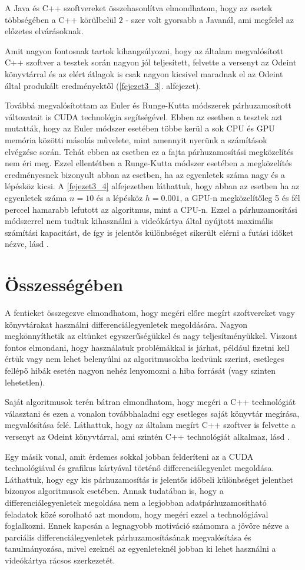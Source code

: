 A Java és C++ szoftvereket összehasonlítva elmondhatom, hogy az esetek többségében a C++ körülbelül $ 2 $ - szer volt gyorsabb a Javanál, ami megfelel az előzetes elvárásoknak.

Amit nagyon fontosnak tartok kihangsúlyozni, hogy az általam megvalósított C++ szoftver a tesztek során nagyon jól teljesített, felvette a versenyt az Odeint könyvtárral és az elért átlagok is csak nagyon kicsivel maradnak el az Odeint által produkált eredményektől (\ref{fejezet3_3}. alfejezet).

Továbbá megvalósítottam az Euler és Runge-Kutta módszerek párhuzamosított változatait is CUDA technológia segítségével. Ebben az esetben a tesztek azt mutatták, hogy az Euler módszer esetében többe kerül a sok CPU és GPU memória közötti másolás művelete, mint amennyit nyerünk a számítások elvégzése során. Tehát ebben az esetben ez a fajta párhuzamosítási megközelítés nem éri meg. Ezzel ellentétben a Runge-Kutta módszer esetében a megközelítés eredményesnek bizonyult abban az esetben, ha az egyenletek száma nagy és a lépésköz kicsi. A \ref{fejezet3_4} alfejezetben láthattuk, hogy abban az esetben ha az egyenletek száma $ n = 10 $ és a lépésköz $ h = 0.001 $, a GPU-n megközelítőleg 5 és fél perccel hamarabb lefutott az algoritmus, mint a CPU-n. Ezzel a párhuzamosítási módszerrel nem tudtuk kihasználni a videókártya által nyújtott maximális számítási kapacitást, de így is jelentős különbséget sikerült elérni a futási időket nézve, l\'asd \cite{Katai}.



\section {Összességében}

A fentieket összegezve elmondhatom, hogy megéri előre megírt szoftvereket vagy könyvtárakat használni differenciálegyenletek megoldására. Nagyon megkönnyíthetik az eltünket egyszerűségükkel és nagy teljesítményükkel. Viszont fontos elmondani, hogy használatuk problémákkal is járhat, például fizetni kell értük vagy nem lehet belenyúlni az algoritmusokba kedvünk szerint, esetleges fellépő hibák esetén nagyon nehéz lenyomozni a hiba forrását (vagy szinten lehetetlen).

Saját algoritmusok terén bátran elmondhatom, hogy megéri a C++ technológiát választani és ezen a vonalon továbbhaladni egy esetleges saját könyvtár megírása, megvalósítása felé. Láthattuk, hogy az általam megírt C++ szoftver is felvette a versenyt az Odeint könyvtárral, ami szintén C++ technológiát alkalmaz, l\'asd \cite{Antal}.

Egy másik vonal, amit érdemes sokkal jobban felderíteni az a CUDA technológiával és grafikus kártyával történő differenciálegyenlet megoldása. Láthattuk, hogy egy kis párhuzamosítás is jelentős időbeli különbséget jelenthet bizonyos algoritmusok esetében. Annak tudatában is, hogy a differenciálegyenletek megoldása nem a legjobban adatpárhuzamosítható feladatok közé sorolható azt mondom, hogy megéri ezzel a technológiával foglalkozni. Ennek kapcsán a legnagyobb motiváció számomra a jövőre nézve a parciális differenciálegyenletek párhuzamosításának megvalósítása és tanulmányozása, mivel ezeknél az egyenleteknél jobban ki lehet használni a videókártya rácsos szerkezetét.